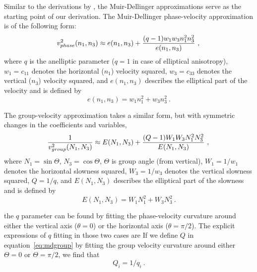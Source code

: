Similar to the derivations by \cite{fomel}, the Muir-Dellinger approximations \cite[]{md,mdk} serve as the starting point of our derivation. The Muir-Dellinger phase-velocity approximation is of the following form:
\begin{equation}
v^2_{phase}(n_1,n_3) \approx  e(n_1,n_3) + \frac{(q-1)w_1w_3n^2_{1}n^2_{3}}{e(n_1,n_3)}~, \\
\label{eq:mdphase}
\end{equation}
where $q$ is the anelliptic parameter ($q = 1$ in case of elliptical anisotropy), $w_1=c_{11}$ denotes the horizontal ($n_1$) velocity squared, $w_3=c_{33}$ denotes the vertical ($n_3$) velocity squared,
and $e(n_1,n_3)$ describes the elliptical part of the velocity and is defined by
\begin{equation}
e(n_1,n_3) = w_1n^2_1 + w_3n^2_3~.
\end{equation}

The group-velocity approximation takes a similar form, but with symmetric changes in the coefficients and variables,
\begin{equation}
\frac{1}{v^2_{group}(N_1,N_3)} \approx E(N_1,N_3) + \frac{(Q-1)W_1W_3N^2_{1}N^2_{3}}{E(N_1,N_3)}~, \\
\label{eq:mdgroup}
\end{equation}
where $N_1 = \sin\Theta$, $N_3 = \cos\Theta $, $\Theta$ is group angle (from vertical), $W_1=1/w_{1}$ denotes the horizontal  slowness squared, $W_3=1/w_{3}$ denotes the vertical  slowness squared,
$Q = 1/q$, and $E(N_1,N_3)$ describes the elliptical part of the slowness and is defined by
\begin{equation}
E(N_1,N_3) = W_1N^2_1 + W_3N^2_3~.
\end{equation}

 the $q$ parameter can be found by fitting the phase-velocity curvature around either the vertical axis ($\theta = 0$)  or the horizontal axis ($\theta = \pi/2$). The explicit expressions of $q$ fitting in those two cases are  If we define $Q$ in equation~\ref{eq:mdgroup} by fitting the group velocity curvature around either $\Theta = 0$ or $\Theta = \pi/2$, we find that
\begin{equation}
 Q_i=1/q_i~.
\end{equation}

